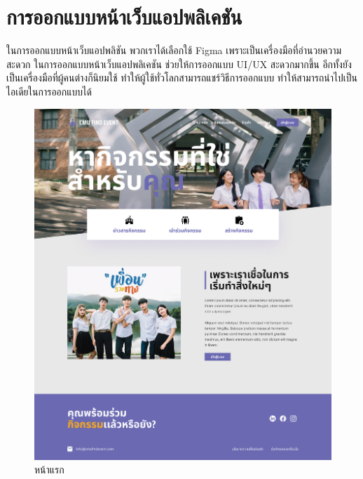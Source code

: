 \section{การออกแบบหน้าเว็บแอปพลิเคชัน}
ในการออกแบบหน้าเว็บแอปพลิชัน พวกเราได้เลือกใช้ Figma เพราะเป็นเครื่องมือที่อำนวยความสะดวก ในการออกแบบหน้าเว็บแอปพลิเคชัน ช่วยให้การออกแบบ UI/UX สะดวกมากขึ้น อีกทั้งยังเป็นเครื่องมือที่ผู้คนต่างก็นิยมใช้
ทำให้ผู้ใช้ทั่วโลกสามารถแชร์วิธีการออกแบบ ทำให้สามารถนำไปเป็นไอเดียในการออกแบบได้ 
\begin{figure}[h]
\begin{center}
\includegraphics[width=0.5\linewidth]{image/Figma-design/Main-not-login.png}
\end{center}
\caption[Poem]{หน้าแรก}
\label{fig:main}
\end{figure}

